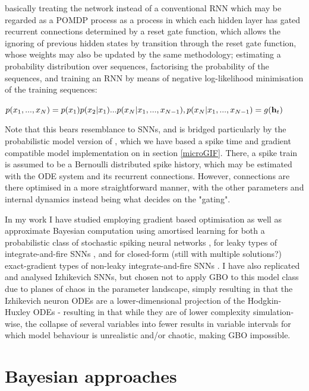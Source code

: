 \documentclass[mphil,deptreport,ai]{infthesis} %
\begin{document}
basically treating the network instead of a conventional RNN which may be regarded as a POMDP process as a process in which each hidden layer has gated recurrent connections determined by a reset gate function, which allows the ignoring of previous hidden states by transition through the reset gate function, whose weights may also be updated by the same methodology;
estimating a probability distribution over sequences, factorising the probability of the sequences, and training an RNN by means of negative log-likelihood minimisation of the training sequences:

\begin{math}
    p(x_1, ..., x_N) = p(x_1)p(x_2|x_1) ... p(x_N|x_1,...,x_{N-1}), \\
    p(x_N|x_1,...,x_{N-1}) = g(\textbf{h}_t)
\end{math}

Note that this bears resemblance to SNNs, and is bridged particularly by the probabilistic model version of \cite{Rene2020}, which we have based a spike time and gradient compatible model implementation on in section \ref{microGIF}.
There, a spike train is assumed to be a Bernoulli distributed spike history, which may be estimated with the ODE system and its recurrent connections.
However, connections are there optimised in a more straightforward manner, with the other parameters and internal dynamics instead being what decides on the "gating".

In my work I have studied employing gradient based optimisation as well as approximate Bayesian computation using amortised learning for both a probabilistic class of stochastic spiking neural networks \cite{Rene2020}, for leaky types of integrate-and-fire SNNs \cite{allen_glif_white_paper}, and for closed-form (still with multiple solutions?) exact-gradient types of non-leaky integrate-and-fire SNNs \cite{Huh2017}.
I have also replicated and analysed Izhikevich SNNs, but chosen not to apply GBO to this model class due to planes of chaos in the parameter landscape, simply resulting in that the Izhikevich neuron ODEs are a lower-dimensional projection of the Hodgkin-Huxley ODEs - resulting in that while they are of lower complexity simulation-wise, the collapse of several variables into fewer results in variable intervals for which model behaviour is unrealistic and/or chaotic, making GBO impossible.


\section{Bayesian approaches}
\end{document}
